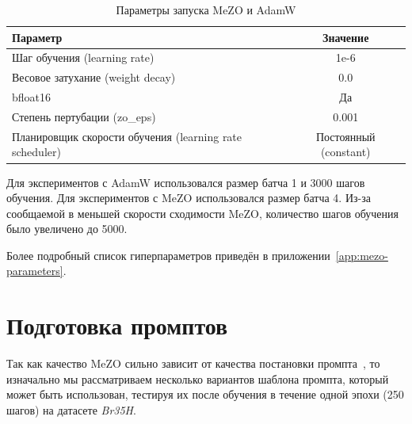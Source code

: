 \documentclass[LI,KR]{HSEUniversity}
\begin{document}
\begin{table}[H]
\centering
\begin{tabular}{|l|c|}
\hline
Параметр & Значение \\ \hline
Шаг обучения (learning rate) & 1e-6 \\ \hline
Весовое затухание (weight decay) & 0.0 \\ \hline
bfloat16 & Да \\ \hline
Степень пертубации (zo\_eps) & 0.001 \\ \hline
Планировщик скорости обучения (learning rate scheduler) & Постоянный (constant) \\ \hline
\end{tabular}
\caption{Параметры запуска MeZO и AdamW}
\end{table}

Для экспериментов с AdamW использовался размер батча 1 и 3000 шагов обучения.
Для экспериментов с MeZO использовался размер батча 4.
Из-за сообщаемой в \cite{mezo} меньшей скорости сходимости MeZO, количество шагов обучения было увеличено до 5000.

Более подробный список гиперпараметров приведён в приложении~\ref{app:mezo-parameters}.

\section{Подготовка промптов}

Так как качество MeZO сильно зависит от качества постановки промпта~\cite{mezo},
то изначально мы рассматриваем несколько вариантов шаблона промпта, который может быть использован,
тестируя их после обучения в течение одной эпохи (250 шагов) на датасете \textit{Br35H}.
\end{document}
